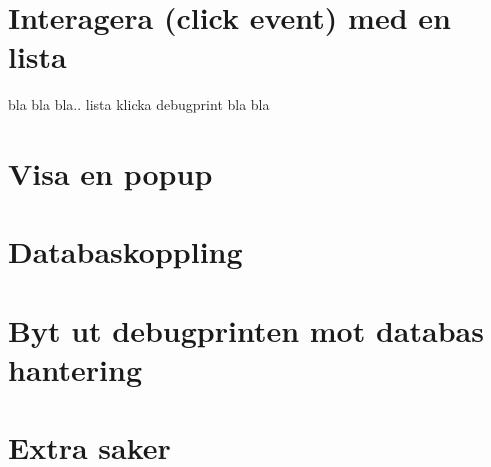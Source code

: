 \documentclass[11 pt]{article} %
\begin{document}
\section{Interagera (click event) med en lista}
bla bla bla.. lista klicka debugprint bla bla

\section{Visa en popup}

\section{Databaskoppling}

\section{Byt ut debugprinten mot databas hantering}

\section{Extra saker}


\end{document}
